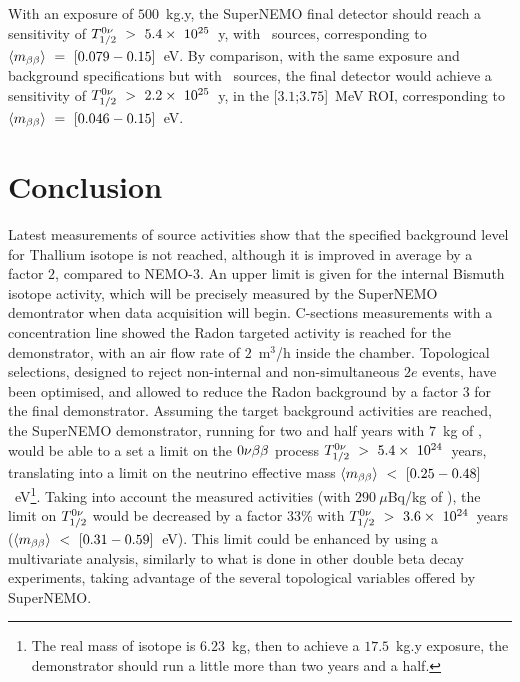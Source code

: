 With an exposure of $500$~kg.y, the SuperNEMO final detector should reach a sensitivity of $T_{1/2}^{0\nu}~>~5.4\times~10^{25}$~y, with \Se\ sources, corresponding to $\langle m_{\beta\beta}\rangle~=~[0.079-0.15]$~eV.
By comparison, with the same exposure and background specifications but with \Nd\ sources, the final detector would achieve a sensitivity of $T_{1/2}^{0\nu}~>~2.2\times~10^{25}$~y, in the [$3.1$;$3.75$]~MeV ROI, corresponding to $\langle m_{\beta\beta}\rangle~=~[0.046-0.15]$~eV.


\section{Conclusion}

Latest measurements of source activities show that the specified background level for Thallium isotope is not reached, although it is improved in average by a factor $2$, compared to NEMO-$3$.
An upper limit is given for the internal Bismuth isotope activity, which will be precisely measured by the SuperNEMO demontrator when data acquisition will begin.
C-sections measurements with a concentration line showed the Radon targeted activity is reached for the demonstrator, with an air flow rate of $2$~m$^{3}$/h inside the chamber.
Topological selections, designed to reject non-internal and non-simultaneous $2e$ events, have been optimised, and allowed to reduce the Radon background by a factor $3$ for the final demonstrator.
Assuming the target background activities are reached, the SuperNEMO demonstrator, running for two and half years with $7$~kg of \Se, would be able to a set a limit on the $0\nu\beta\beta$ process $T_{1/2}^{0\nu}~>~5.4\times~10^{24}$~years, translating into a limit on the neutrino effective mass $\langle m_{\beta\beta}\rangle~<~[0.25-0.48]$~eV\footnote{The real mass of isotope is $6.23$~kg, then to achieve a $17.5$~kg.y exposure, the demonstrator should run a little more than two years and a half.}.
Taking into account the measured activities (with $290~\mu$Bq/kg of \Bi), the limit on $T_{1/2}^{0\nu}$ would be decreased by a factor $33$\% with $T_{1/2}^{0\nu}~>~3.6\times~10^{24}$~years ($\langle m_{\beta\beta}\rangle~<~[0.31-0.59]$~eV).
This limit could be enhanced by using a multivariate analysis, similarly to what is done in other double beta decay experiments, taking advantage of the several topological variables offered by SuperNEMO.

